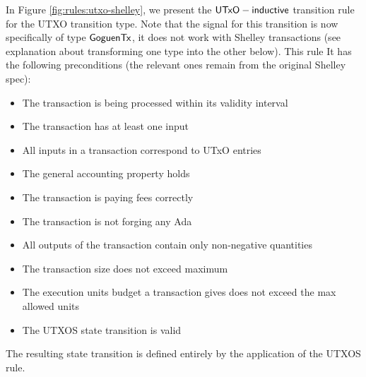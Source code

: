 In Figure \ref{fig:rules:utxo-shelley}, we present the $\mathsf{UTxO-inductive}$
transition rule for the UTXO transition type. Note that the
signal for this transition is now specifically of type $\mathsf{GoguenTx}$, it does not
work with Shelley transactions (see explanation about transforming one type into
the other below). This rule
It has the following preconditions (the relevant ones remain
from the original Shelley spec):

\begin{itemize}
  \item The transaction is being processed within its validity interval

  \item The transaction has at least one input

  \item All inputs in a transaction correspond to UTxO entries

  \item The general accounting property holds

  \item The transaction is paying fees correctly

  \item The transaction is not forging any Ada

  \item All outputs of the transaction contain only non-negative quantities

  \item The transaction size does not exceed maximum

  \item The execution units budget a transaction gives does not exceed the max
  allowed units

  \item The UTXOS state transition is valid
\end{itemize}

The resulting state transition is defined entirely by the application of the
UTXOS rule.

